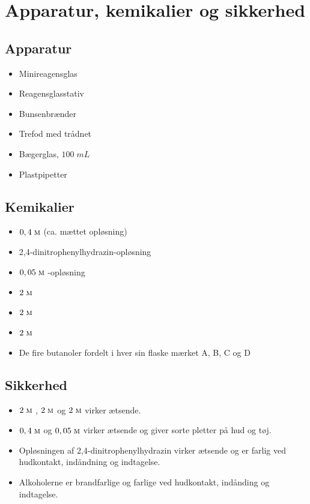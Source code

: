 \documentclass{report}
\begin{document}
\section*{Apparatur, kemikalier og sikkerhed}
\subsection*{Apparatur}
\begin{itemize}
  \item Minireagensglas
  \item Reagensglasstativ
\item Bunsenbrænder
\item Trefod med trådnet
\item Bægerglas, $100 \;\unit{mL} $
\item Plastpipetter
\end{itemize}
\subsection*{Kemikalier}
\begin{itemize}
  \item $0,4 \;\unit{\textsc{m}} $  (ca. mættet opløsning)
\item 2,4-dinitrophenylhydrazin-opløsning
\item $0,05 \;\unit{\textsc{m}} $ -opløsning
\item $2 \;\unit{\textsc{m}} $   
\item $2 \;\unit{\textsc{m}} $  
\item $2 \;\unit{\textsc{m}} $  
\item De fire butanoler fordelt i hver sin flaske mærket A, B, C og D
\end{itemize}
\subsection*{Sikkerhed}
\begin{itemize}
  \item $2 \;\unit{\textsc{m}} $ , $2 \;\unit{\textsc{m}} $  og $2 \;\unit{\textsc{m}} $  virker ætsende.
 \item $0,4 \;\unit{\textsc{m}} $  og $0,05 \;\unit{\textsc{m}} $  virker ætsende og giver sorte pletter på hud og tøj.
\item Opløsningen af 2,4-dinitrophenylhydrazin virker ætsende og er farlig ved hudkontakt, indåndning og indtagelse.
\item Alkoholerne er brandfarlige og farlige ved hudkontakt, indånding og indtagelse. 
\end{itemize}
\end{document}
